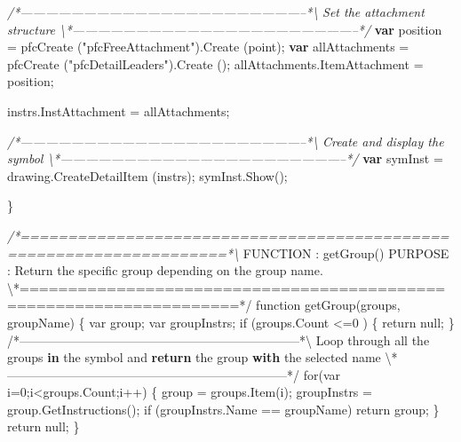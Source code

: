 \documentclass[]{article}
\newenvironment{Shaded}{}{}
\newcommand{\KeywordTok}[1]{\textcolor[rgb]{0.00,0.44,0.13}{\textbf{{#1}}}}
\newcommand{\FloatTok}[1]{\textcolor[rgb]{0.25,0.63,0.44}{{#1}}}
\newcommand{\StringTok}[1]{\textcolor[rgb]{0.25,0.44,0.63}{{#1}}}
\newcommand{\CommentTok}[1]{\textcolor[rgb]{0.38,0.63,0.69}{\textit{{#1}}}}
\newcommand{\OtherTok}[1]{\textcolor[rgb]{0.00,0.44,0.13}{{#1}}}
\newcommand{\FunctionTok}[1]{\textcolor[rgb]{0.02,0.16,0.49}{{#1}}}
\newcommand{\NormalTok}[1]{{#1}}
\begin{document}
\begin{Shaded}
\begin{Highlighting}[]
\CommentTok{/*--------------------------------------------------------------------*\textbackslash{}    }
\CommentTok{  Set the attachment structure}
\CommentTok{\textbackslash{}*--------------------------------------------------------------------*/} 
  \KeywordTok{var} \NormalTok{position = }\FunctionTok{pfcCreate} \NormalTok{(}\StringTok{"pfcFreeAttachment"}\NormalTok{).}\FunctionTok{Create} \NormalTok{(point);}
  \KeywordTok{var} \NormalTok{allAttachments = }\FunctionTok{pfcCreate} \NormalTok{(}\StringTok{"pfcDetailLeaders"}\NormalTok{).}\FunctionTok{Create} \NormalTok{();    }
  \OtherTok{allAttachments}\NormalTok{.}\FunctionTok{ItemAttachment} \NormalTok{= position;}
  
  \OtherTok{instrs}\NormalTok{.}\FunctionTok{InstAttachment} \NormalTok{= allAttachments;}

\CommentTok{/*--------------------------------------------------------------------*\textbackslash{}    }
\CommentTok{  Create and display the symbol }
\CommentTok{\textbackslash{}*--------------------------------------------------------------------*/}  
  \KeywordTok{var} \NormalTok{symInst = }\OtherTok{drawing}\NormalTok{.}\FunctionTok{CreateDetailItem} \NormalTok{(instrs);}
  \OtherTok{symInst}\NormalTok{.}\FunctionTok{Show}\NormalTok{();}
       
\NormalTok{\}}

\CommentTok{/*====================================================================*\textbackslash{}}
 \NormalTok{FUNCTION : }\FunctionTok{getGroup}\NormalTok{() }
 \NormalTok{PURPOSE  : Return the specific group depending on the group }\OtherTok{name}\NormalTok{. }
\NormalTok{\textbackslash{}*====================================================================*}\OtherTok{/    }
\OtherTok{function getGroup}\FloatTok{(}\OtherTok{groups, groupName}\FloatTok{)}
\OtherTok{\{}
\OtherTok{    var group;}
\OtherTok{    var groupInstrs;}
\OtherTok{    }
\OtherTok{    if }\FloatTok{(}\OtherTok{groups.Count <=0 }\FloatTok{)}
\OtherTok{    \{}
\OtherTok{        return null;}
\OtherTok{    \}}
\OtherTok{    }
\OtherTok{/}\NormalTok{*--------------------------------------------------------------------*\textbackslash{}    }
   \NormalTok{Loop through all the groups }\KeywordTok{in} \NormalTok{the symbol and }\KeywordTok{return} \NormalTok{the group }\KeywordTok{with} 
   \NormalTok{the selected name}
\NormalTok{\textbackslash{}*--------------------------------------------------------------------*}\OtherTok{/  }
\OtherTok{    for}\FloatTok{(}\OtherTok{var i=0;i<groups.Count;i}\FloatTok{++)}
\OtherTok{    \{}
\OtherTok{        group = groups.Item}\FloatTok{(}\OtherTok{i}\FloatTok{)}\OtherTok{;}
\OtherTok{        groupInstrs = group.GetInstructions}\FloatTok{()}\OtherTok{;}
\OtherTok{        }
\OtherTok{        if }\FloatTok{(}\OtherTok{groupInstrs.Name == groupName}\FloatTok{)}
\OtherTok{            return group;           }
\OtherTok{    \}}
\OtherTok{    return null;        }
\OtherTok{\}}
\end{Highlighting}
\end{Shaded}
\end{document}
